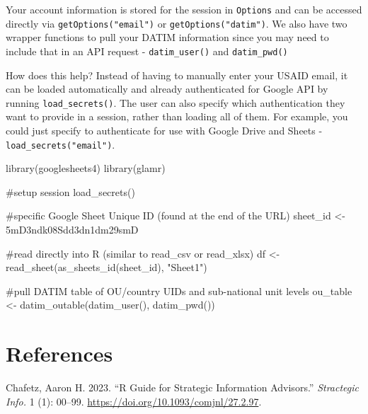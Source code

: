 \documentclass[
  letterpaper,
  DIV=11,
  numbers=noendperiod]{scrreprt}
\newenvironment{Shaded}{\begin{snugshade}}{\end{snugshade}}
\newcommand{\CommentTok}[1]{\textcolor[rgb]{0.37,0.37,0.37}{#1}}
\newcommand{\FunctionTok}[1]{\textcolor[rgb]{0.28,0.35,0.67}{#1}}
\newcommand{\NormalTok}[1]{\textcolor[rgb]{0.00,0.23,0.31}{#1}}
\newcommand{\OtherTok}[1]{\textcolor[rgb]{0.00,0.23,0.31}{#1}}
\newcommand{\StringTok}[1]{\textcolor[rgb]{0.13,0.47,0.30}{#1}}
\newlength{\cslhangindent}
\newlength{\cslentryspacingunit} %
\newenvironment{CSLReferences}[2] %
 {%
  \setlength{\parindent}{0pt}
  \ifodd #1
  \let\oldpar\par
  \def\par{\hangindent=\cslhangindent\oldpar}
  \fi
  \setlength{\parskip}{#2\cslentryspacingunit}
 }%
 {}
\begin{document}
Your account information is stored for the session in \texttt{Options}
and can be accessed directly via \texttt{getOptions("email")} or
\texttt{getOptions("datim")}. We also have two wrapper functions to pull
your DATIM information since you may need to include that in an API
request - \texttt{datim\_user()} and \texttt{datim\_pwd()}

How does this help? Instead of having to manually enter your USAID
email, it can be loaded automatically and already authenticated for
Google API by running \texttt{load\_secrets()}. The user can also
specify which authentication they want to provide in a session, rather
than loading all of them. For example, you could just specify to
authenticate for use with Google Drive and Sheets -
\texttt{load\_secrets("email")}.

\begin{Shaded}
\begin{Highlighting}[]
\FunctionTok{library}\NormalTok{(googlesheets4)}
\FunctionTok{library}\NormalTok{(glamr)}

\CommentTok{\#setup session}
  \FunctionTok{load\_secrets}\NormalTok{()}

\CommentTok{\#specific Google Sheet Unique ID (found at the end of the URL)}
\NormalTok{  sheet\_id }\OtherTok{\textless{}{-}} \StringTok{\textquotesingle{}5mD3ndk08Sdd3dn1dm29smD\textquotesingle{}}

\CommentTok{\#read directly into R (similar to read\_csv or read\_xlsx)}
\NormalTok{  df }\OtherTok{\textless{}{-}} \FunctionTok{read\_sheet}\NormalTok{(}\FunctionTok{as\_sheets\_id}\NormalTok{(sheet\_id), }\StringTok{"Sheet1"}\NormalTok{)}
  
\CommentTok{\#pull DATIM table of OU/country UIDs and sub{-}national unit levels}
\NormalTok{  ou\_table }\OtherTok{\textless{}{-}} \FunctionTok{datim\_outable}\NormalTok{(}\FunctionTok{datim\_user}\NormalTok{(), }\FunctionTok{datim\_pwd}\NormalTok{())}
\end{Highlighting}
\end{Shaded}


\hypertarget{references}{%
\chapter*{References}\label{references}}


\hypertarget{refs}{}
\begin{CSLReferences}{1}{0}
\leavevmode{}%
Chafetz, Aaron H. 2023. {``R Guide for Strategic Information
Advisors.''} \emph{Stractegic Info.} 1 (1): 00--99.
\url{https://doi.org/10.1093/comjnl/27.2.97}.

\end{CSLReferences}
\end{document}
